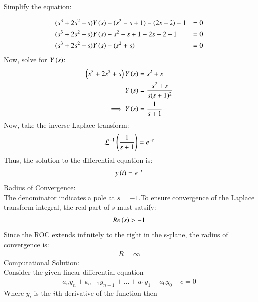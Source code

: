 \documentclass[journal]{IEEEtran}
\begin{document}
Simplify the equation:

\begin{align}
&(s^3 + 2s^2 + s) Y\left(s\right) - (s^2 - s + 1) - (2s - 2) - 1 &= 0 \\
&(s^3 + 2s^2 + s) Y\left(s\right) - s^2 - s + 1 - 2s + 2 - 1 &= 0 \\
&(s^3 + 2s^2 + s) Y\left(s\right) - (s^2 + s) &= 0
\end{align}
Now, solve for \( Y\left(s\right) \):
\begin{align}
\left(s^3 + 2s^2 + s\right) Y\left(s\right) &= s^2 + s \\
Y\left(s\right) &= \frac{s^2 + s}{s(s+1)^2}\\
\implies Y\left(s\right) &= \frac{1}{s + 1}
\end{align}
Now, take the inverse Laplace transform:
\begin{align}
\mathcal{L}^{-1}\left(\frac{1}{s + 1}\right) = e^{-t}
\end{align}
Thus, the solution to the differential equation is:
\begin{align}
   y\left(t\right) = e^{-t} 
\end{align}
\newline
Radius of Convergence:\\
The denominator indicates a pole at $s=-1$.To ensure convergence of the Laplace transform integral, the real part of $s$ must satsify:
\begin{align}
    Re\left(s\right)>-1
\end{align}
Since the ROC extends infinitely to the right in the s-plane, the radius of convergence is:
\begin{align}
    R=\infty
\end{align}
Computational Solution:\\
Consider the given linear differential equation
\begin{align}
	a_{n}y_{n} + a_{n-1}y_{n-1} + \dots + a_{1}y_1 + a_{0}y_{0} + c = 0
\end{align}
Where $y_{i}$ is the $i$th derivative of the function then
\end{document}
